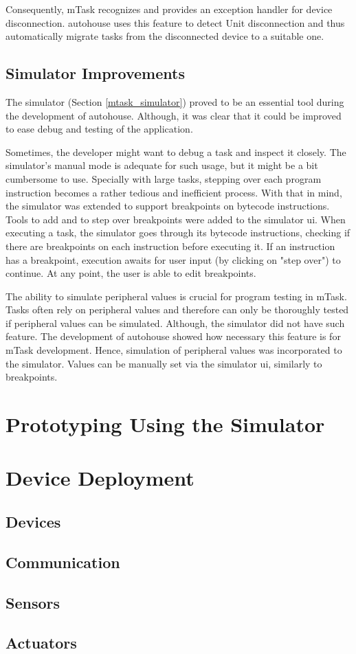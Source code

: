 Consequently, \gls{mTask} recognizes and provides an exception handler for device disconnection. \gls{autohouse} uses this feature to detect Unit disconnection and thus automatically migrate tasks from the disconnected device to a suitable one.

\subsection{Simulator Improvements}

The simulator (Section \ref{mtask_simulator}) proved to be an essential tool during the development of \gls{autohouse}. Although, it was clear that it could be improved to ease debug and testing of the application. 

Sometimes, the developer might want to debug a task and inspect it closely. The simulator's manual mode is adequate for such usage, but it might be a bit cumbersome to use. Specially with large tasks, stepping over each program instruction becomes a rather tedious and inefficient process. With that in mind, the simulator was extended to support breakpoints on bytecode instructions. Tools to add and to step over breakpoints were added to the simulator \acs{ui}. When executing a task, the simulator goes through its bytecode instructions, checking if there are breakpoints on each instruction before executing it. If an instruction has a breakpoint, execution awaits for user input (by clicking on "step over") to continue. At any point, the user is able to edit breakpoints. 

The ability to simulate peripheral values is crucial for program testing in \gls{mTask}. Tasks often rely on peripheral values and therefore can only be thoroughly tested if peripheral values can be simulated. Although, the simulator did not have such feature. The development of \gls{autohouse} showed how necessary this feature is for \gls{mTask} development. Hence, simulation of peripheral values was incorporated to the simulator. Values can be manually set via the simulator \acs{ui}, similarly to breakpoints. 

\section{Prototyping Using the Simulator}

\section{Device Deployment}
\subsection{Devices}
\subsection{Communication}
\subsection{Sensors}
\subsection{Actuators}
